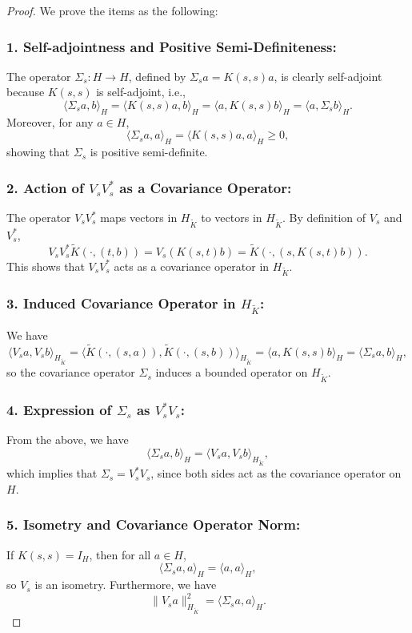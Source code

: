 \documentclass[11pt]{amsart}
\theoremstyle{definition}
\numberwithin{equation}{section}
\begin{document}
\begin{proof}
We prove the items as the following:
\subsubsection*{1. Self-adjointness and Positive Semi-Definiteness:} The operator \( \Sigma_s: H \to H \), defined by \( \Sigma_s a = K(s,s)a \), is clearly self-adjoint because \( K(s,s) \) is self-adjoint, i.e.,
    \[
    \langle \Sigma_s a, b \rangle_H = \langle K(s,s)a, b \rangle_H = \langle a, K(s,s)b \rangle_H = \langle a, \Sigma_s b \rangle_H.
    \]
    Moreover, for any \( a \in H \),
    \[
    \langle \Sigma_s a, a \rangle_H = \langle K(s,s) a, a \rangle_H \geq 0,
    \]
    showing that \( \Sigma_s \) is positive semi-definite.
    
\subsubsection*{2. Action of \( V_s V_s^* \) as a Covariance Operator:} The operator \( V_s V_s^* \) maps vectors in \( H_{\tilde{K}} \) to vectors in \( H_{\tilde{K}} \). By definition of \( V_s \) and \( V_s^* \),
    \[
    V_s V_s^* \tilde{K}(\cdot, (t, b)) = V_s (K(s, t) b) = \tilde{K}(\cdot, (s, K(s,t) b)).
    \]
    This shows that \( V_s V_s^* \) acts as a covariance operator in \( H_{\tilde{K}} \).
    
\subsubsection*{3. Induced Covariance Operator in \( H_{\tilde{K}} \):} We have
    \[
    \langle V_s a, V_s b \rangle_{H_{\tilde{K}}} = \langle \tilde{K}(\cdot, (s, a)), \tilde{K}(\cdot, (s, b)) \rangle_{H_{\tilde{K}}} = \langle a, K(s,s) b \rangle_H = \langle \Sigma_s a, b \rangle_H,
    \]
    so the covariance operator \( \Sigma_s \) induces a bounded operator on \( H_{\tilde{K}} \).
    
\subsubsection*{4. Expression of \( \Sigma_s \) as \( V_s^* V_s \):} From the above, we have
    \[
    \langle \Sigma_s a, b \rangle_H = \langle V_s a, V_s b \rangle_{H_{\tilde{K}}},
    \]
    which implies that \( \Sigma_s = V_s^* V_s \), since both sides act as the covariance operator on \( H \).
    
\subsubsection*{5. Isometry and Covariance Operator Norm:} If \( K(s,s) = I_H \), then for all \( a \in H \),
    \[
    \langle \Sigma_s a, a \rangle_H = \langle a, a \rangle_H,
    \]
    so \( V_s \) is an isometry. Furthermore, we have
    \[
    \| V_s a \|_{H_{\tilde{K}}}^2 = \langle \Sigma_s a, a \rangle_H.
    \]

\end{proof}
\end{document}

